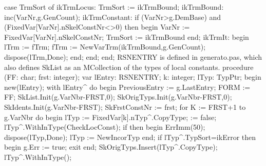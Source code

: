       case TrmSort of
         ikTrmLocus: TrmSort := ikTrmBound;
         ikTrmBound: inc(VarNr,g.GenCount);
         ikTrmConstant:
            if (VarNr>g.DemBase) and (FixedVar[VarNr].nSkelConstNr<>0) then
            begin VarNr := FixedVar[VarNr].nSkelConstNr; TrmSort := ikTrmBound end;
         ikTrmIt:
            begin lTrm := fTrm; fTrm := NewVarTrm(ikTrmBound,g.GenCount);
            dispose(lTrm,Done);
            end;
      end;
end;
\eatline
{}\nwendcode{}\nwdocspar
{\Tt{}RSNENTRY\nwendquote} is defined in generato.pas, which also defines {\Tt{}SkList\nwendquote}
as an {\Tt{}MCollection\nwendquote} of the types of local constants.
\nwenddocs{}\endmoddef\nwstartdeflinemarkup{}\nwenddeflinemarkup
procedure (FF: char; frst: integer);
var
   lEntry: RSNENTRY;
   k: integer;
   lTyp: TypPtr;
begin
   new(lEntry);
   with lEntry^ do
   begin
      PreviousEntry := g.LastEntry;
      FORM := FF;
      SkList.Init(g.VarNbr-FRST,0);
      SkOrigTyps.Init(g.VarNbr-FRST,0);
      SkIdents.Init(g.VarNbr-FRST);
      SkFrstConstNr := frst;
      for K := FRST+1 to g.VarNbr do
      begin
         lTyp := FixedVar[k].nTyp^.CopyType;
          := false;
         lTyp^.WithInType(CheckLocConst);
         if  then
         begin ErrImm(50); dispose(lTyp,Done); lTyp := NewIncorTyp end;
         if lTyp^.TypSort=ikError then begin g.Err := true; exit end;
         SkOrigTyps.Insert(lTyp^.CopyType);
         lTyp^.WithInType();
